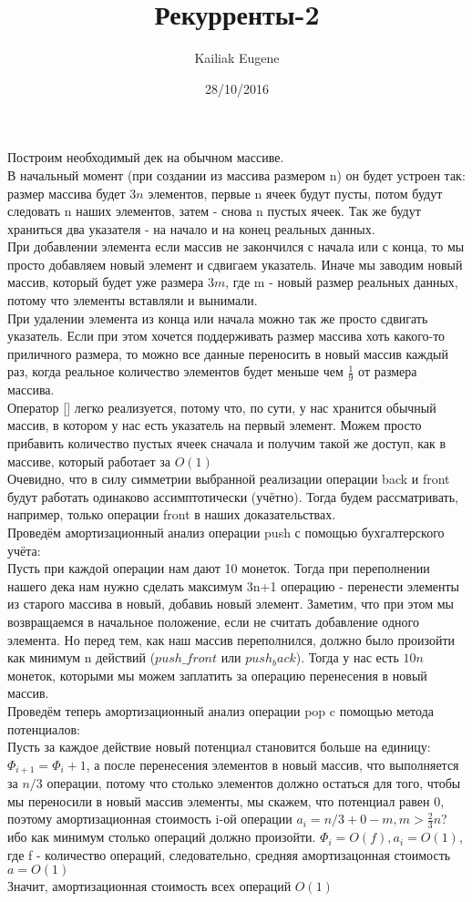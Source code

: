 \documentclass[12pt]{article}
\title{Рекурренты-2}
\date{28/10/2016}
\author{Kailiak Eugene}
\begin{document}
\maketitle
Построим необходимый дек на обычном массиве. \\
В начальный момент (при создании из массива размером n) он будет устроен так: размер массива будет $3n$ элементов, первые n ячеек будут пусты, потом будут следовать n наших элементов, затем - снова n пустых ячеек. Так же будут храниться два указателя - на начало и на конец реальных данных. \\
При добавлении элемента если массив не закончился с начала или с конца, то мы просто добавляем новый элемент и сдвигаем указатель. Иначе мы заводим новый массив, который будет уже размера $3m$, где m - новый размер реальных данных, потому что элементы вставляли и вынимали. \\
При удалении элемента из конца или начала можно так же просто сдвигать указатель. Если при этом хочется поддерживать размер массива хоть какого-то приличного размера, то можно все данные переносить в новый массив каждый раз, когда реальное количество элементов будет меньше чем $\frac{1}{9}$ от размера массива.\\
Оператор [] легко реализуется, потому что, по сути, у нас хранится обычный массив, в котором у нас есть указатель на первый элемент. Можем просто прибавить количество пустых ячеек сначала и получим такой же доступ, как в массиве, который работает за $O(1)$ \\
Очевидно, что в силу симметрии выбранной реализации операции back и front будут работать одинаково ассимптотически (учётно). Тогда будем рассматривать, например, только операции front в наших доказательствах. \\ 
Проведём амортизационный анализ операции push с помощью бухгалтерского учёта: \\
Пусть при каждой операции нам дают 10 монеток. Тогда при переполнении нашего дека нам нужно сделать максимум 3n+1 операцию - перенести элементы из старого массива в новый, добавиь новый элемент. Заметим, что при этом мы возвращаемся в начальное положение, если не считать добавление одного элемента. Но перед тем, как наш массив переполнился, должно было произойти как минимум n действий ($push\_front$ или $push_back$). Тогда у нас есть $10n$ монеток, которыми мы можем заплатить за операцию перенесения в новый массив. \\
Проведём теперь амортизационный анализ операции pop c помощью метода потенциалов: \\
Пусть за каждое действие новый потенциал становится больше на единицу: $\Phi_{i+1} = \Phi_i + 1$, а после перенесения элементов в новый массив, что выполняется за $n/3$ операции, потому что столько элементов должно остаться для того, чтобы мы переносили в новый массив элементы, мы скажем, что потенциал равен 0, поэтому амортизационная стоимость i-ой операции $a_i = n/3 + 0 - m , m > \frac{2}{3} n$? ибо как минимум столько операций должно произойти. $\Phi_i = O(f), a_i = O(1)$, где f - количество операций, следовательно, средняя амортизацонная стоимость $a = O(1)$ \\
Значит, амортизационная стоимость всех операций $O(1)$
\end{document}
